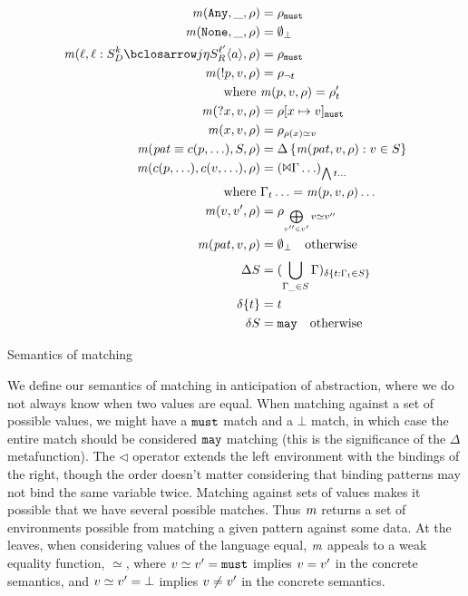   {\begin{align*}
    \matches(\sany, \_, \menv) &= \menv_\must \\
    \matches(\snone, \_, \menv) &= \emptyset_\bot \\
    \matches(\mtoplevelname,
    \bclos{\mtoplevelname}{\mscon_D}{k}{j}{\mtimeline}{\mscon_R}{\mmlab^{\prime}}{\maddr},
    \menv) &= \menv_\must \\
    \matches(\snegpat{\mvpat}, \mdata, \menv) &= \menv_{\neg \mvaluation} \\
    \text{where }& \matches(\mvpat, \mdata, \menv) = \menv'_\mvaluation \\
    \matches(\sbind{\mvar}, \mdata, \menv) &= \menv[\mvar \mapsto \mdata]_\must \\
    \matches(\mvar, \mdata, \menv) &= \menv_{\menv(\mvar) \simeq \mdata} \\
    \matches(\mpat\equiv\mconstructor(\mvpat, \ldots), S, \menv) &= \Delta\setbuild{\matches(\mpat, \mdata, \menv)}{\mdata \in S} \\
    \matches(\mconstructor(\mvpat, \ldots), \mconstructor(\mdata, \ldots), \menv) &= (\Bowtie \menvs \ldots)_{\bigwedge \mvaluation \ldots} \\
    \text{where }& \menvs_\mvaluation \ldots = \matches(\mvpat, \mdata, \menv) \ldots \\
    \matches(\mdata, \mdata', \menv) &= \menv_{\bigoplus\limits_{\mdata'' \in \mdata'}{{\mdata \simeq \mdata''}}} \\
    \matches(\mpat, \mdata, \menv) &= \emptyset_\bot \quad
    \text{otherwise}
    \\[2pt]
    \Delta S &= (\bigcup\limits_{\menvs_{\_} \in S}\menvs)_{\delta \setbuild{\mvaluation}{\menvs_\mvaluation \in S}} \\
    \delta \setof{\mvaluation} &= \mvaluation \\
    \delta S &= \may \quad \text{otherwise}
  \end{align*}}{\caption{Semantics of matching}\label{fig:matchsem}}

We define our semantics of matching in anticipation of abstraction, where we do not always know when two values are equal.
%
When matching against a set of possible values, we might have a ${\tt must}$ match and a $\bot$ match, in which case the entire match should be considered ${\tt may}$ matching (this is the significance of the $\Delta$ metafunction).
%
The $\triangleleft$ operator extends the left environment with the bindings of the right, though the order doesn't matter considering that binding patterns may not bind the same variable twice.
%
Matching against sets of values makes it possible that we have several possible matches.
%
Thus $\mathit{m}$ returns a set of environments possible from matching a given pattern against some data.
%
At the leaves, when considering values of the language equal, $\mathit{m}$ appeals to a weak equality function, $\simeq$, where $v \simeq v' = {\tt must}$ implies $v = v'$ in the concrete semantics, and $v \simeq v' = \bot$ implies $v \neq v'$ in the concrete semantics.

